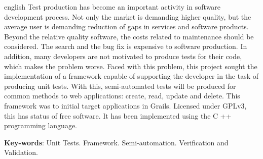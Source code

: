 \begin{resumo}[Abstract]
 \begin{otherlanguage*}{english}
\vspace{\onelineskip}
Test production has become an important activity in software development process.
Not only the market is demanding higher quality, but the average user is demanding
reduction of gaps in services and software products. Beyond the relative quality
software, the costs related to maintenance should be considered. The search and
the bug fix is expensive to software production. In addition, many developers are
not motivated to produce tests for their code, which makes the problem worse.
Faced with this problem, this project sought the implementation of a framework
capable of supporting the developer in the task of producing unit tests. With
this, semi-automated tests will be produced for common methods to web applications:
create, read, update and delete. This framework was to initial target applications
in Grails. Licensed under GPLv3, this \framework has status of free software.
It has been implemented using the C ++ programming language.
\noindent

   \textbf{Key-words}: Unit Tests. Framework. Semi-automation. Verification and Validation.
 \end{otherlanguage*}
\end{resumo}
